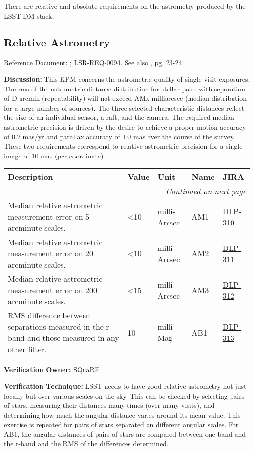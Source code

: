 \documentclass[DM,lsstdraft,toc]{lsstdoc}
\makeatletter
\newcommand{\jira}[1]{\href{https://jira.lsstcorp.org/browse/#1}{#1}}
\newenvironment{metric}[0]{%
\setlength\LTleft{0pt}
\setlength\LTright{\fill}
\begin{longtable}[]{@{}p{0.4\textwidth}lp{0.75in}p{1.3in}p{0.75in}@{}}

\hline \textbf{Description} & \textbf{Value} & \textbf{Unit} & \textbf{Name} & \textbf{JIRA} \\ \hline
\endhead

\hline \multicolumn{5}{r}{\emph{Continued on next page}} \\
\endfoot

\hline\hline
\endlastfoot
}{%
\hline
\end{longtable}
}
\makeatother
\begin{document}
There are relative and absolute requirements on the astrometry produced
by the LSST DM stack.

\subsection{Relative Astrometry}\label{relative-astrometry}

Reference Document: ; LSR-REQ-0094. See also \SRD, pg. 23-24.

\textbf{Discussion:} This KPM concerns the astrometric quality of single
visit exposures. The rms of the astrometric distance distribution for
stellar pairs with separation of D arcmin (repeatability) will not
exceed AMx milliarcsec (median distribution for a large number of
sources). The three selected characteristic distances reflect the size
of an individual sensor, a raft, and the camera. The required median
astrometric precision is driven by the desire to achieve a proper motion
accuracy of 0.2 mas/yr and parallax accuracy of 1.0 mas over the course
of the survey. These two requirements correspond to relative astrometric
precision for a single image of 10 mas (per coordinate).

\begin{metric}
Median relative astrometric measurement error on 5 arcminute scales. &
\textless{}10 & milli-Arcsec & AM1 & \jira{DLP-310}\tabularnewline
Median relative astrometric measurement error on 20 arcminute scales. &
\textless{}10 & milli-Arcsec & AM2 & \jira{DLP-311}\tabularnewline
Median relative astrometric measurement error on 200 arcminute scales. &
\textless{}15 & milli-Arcsec & AM3 & \jira{DLP-312}\tabularnewline
RMS difference between separations measured in the r-band and those
measured in any other filter. & 10 & milli-Mag & AB1 &
\jira{DLP-313}\tabularnewline
\end{metric}

\textbf{Verification Owner:} SQuaRE

\textbf{Verification Technique:} LSST needs to have good relative
astrometry not just locally but over various scales on the sky. This can
be checked by selecting pairs of stars, measuring their distances many
times (over many visits), and determining how much the angular distance
varies around its mean value. This exercise is repeated for pairs of
stars separated on different angular scales. For AB1, the angular
distances of pairs of stars are compared between one band and the r-band
and the RMS of the differences determined.
\end{document}
